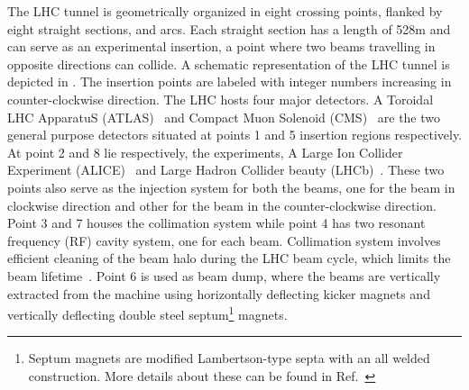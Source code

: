 The LHC tunnel is geometrically organized in eight crossing points, flanked by eight straight sections, and arcs. Each straight section has a 
length of 528\unit{m} and can serve as an experimental insertion, a point where two beams travelling in opposite directions can collide. A schematic 
representation of the LHC tunnel is depicted in \fig{\ref{fig:lhcLayout}}. The insertion points are labeled with 
integer numbers increasing in counter-clockwise direction. The LHC hosts four major detectors. A Toroidal LHC ApparatuS (ATLAS)~\cite{atlasTDR} and 
Compact Muon Solenoid (CMS)~\cite{cmsTDR} are the two general purpose detectors situated at points 1 and 5 insertion regions respectively. At point 2 
and 8 lie respectively, the experiments, A Large Ion Collider Experiment (\gls{ALICE})~\cite{aliceTDR} and Large Hadron Collider beauty (\gls{LHCb})~\cite{lhcbTDR}.
These two points also serve as the injection system for both the beams, one for the beam in clockwise direction and other for the beam in the 
counter-clockwise direction. Point 3 and 7 houses the collimation system while point 4 has two resonant frequency (RF) cavity system, one for each 
beam. Collimation system involves efficient cleaning of the beam halo during the LHC beam cycle, which limits the beam lifetime~\cite{Assmann:569470}. 
Point 6 is used as beam dump, where the beams are vertically extracted from the machine using  horizontally deflecting kicker magnets and vertically
deflecting double steel septum\footnote{Septum magnets are modified Lambertson-type septa with an all welded construction. More details about these 
can be found in Ref.~\cite{Evans:2008zzb}} magnets.

